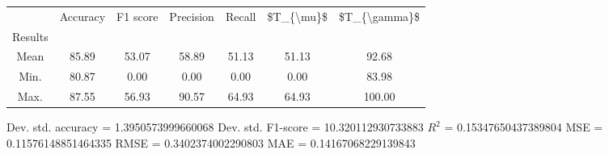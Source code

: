 \begin{tabular}{|c|c|c|c|c|c|c|}
\toprule
{} &  Accuracy &  F1 score &  Precision &  Recall &  \$T\_\{\textbackslash mu\}\$ &  \$T\_\{\textbackslash gamma\}\$ \\
Results &           &           &            &         &            &               \\
\hline
Mean    &     85.89 &     53.07 &      58.89 &   51.13 &      51.13 &         92.68 \\
Min.    &     80.87 &      0.00 &       0.00 &    0.00 &       0.00 &         83.98 \\
Max.    &     87.55 &     56.93 &      90.57 &   64.93 &      64.93 &        100.00 \\
\bottomrule
\end{tabular}

 Dev. std. accuracy = 1.3950573999660068
 Dev. std. F1-score = 10.320112930733883
 $R^2$ = 0.15347650437389804
 MSE = 0.11576148851464335
 RMSE = 0.3402374002290803
 MAE = 0.14167068229139843